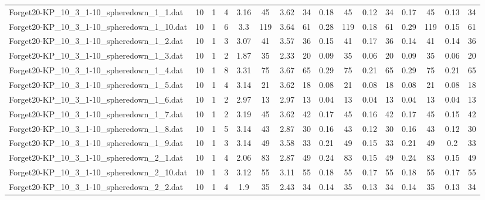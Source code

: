 \begin{sidewaystable}[!ht]
{\begin{tabular}{lccccccccccccccc}
Forget20-KP\_10\_3\_1-10\_spheredown\_1\_1.dat & 10 & 1 & 4 & 3.16 & 45 & 3.62 & 34 & 0.18 & 45 &  \textcolor{blue2}{0.12} & 34 & 0.17 & 45 & 0.13 & 34 \\
Forget20-KP\_10\_3\_1-10\_spheredown\_1\_10.dat & 10 & 1 & 6 & 3.3 & 119 & 3.64 & 61 & 0.28 & 119 & 0.18 & 61 & 0.29 & 119 &  \textcolor{blue2}{0.15} & 61 \\
Forget20-KP\_10\_3\_1-10\_spheredown\_1\_2.dat & 10 & 1 & 3 & 3.07 & 41 & 3.57 & 36 & 0.15 & 41 & 0.17 & 36 &  \textcolor{blue2}{0.14} & 41 &  \textcolor{blue2}{0.14} & 36 \\
Forget20-KP\_10\_3\_1-10\_spheredown\_1\_3.dat & 10 & 1 & 2 & 1.87 & 35 & 2.33 & 20 & 0.09 & 35 &  \textcolor{blue2}{0.06} & 20 & 0.09 & 35 &  \textcolor{blue2}{0.06} & 20 \\
Forget20-KP\_10\_3\_1-10\_spheredown\_1\_4.dat & 10 & 1 & 8 & 3.31 & 75 & 3.67 & 65 & 0.29 & 75 &  \textcolor{blue2}{0.21} & 65 & 0.29 & 75 &  \textcolor{blue2}{0.21} & 65 \\
Forget20-KP\_10\_3\_1-10\_spheredown\_1\_5.dat & 10 & 1 & 4 & 3.14 & 21 & 3.62 & 18 &  \textcolor{blue2}{0.08} & 21 &  \textcolor{blue2}{0.08} & 18 &  \textcolor{blue2}{0.08} & 21 &  \textcolor{blue2}{0.08} & 18 \\
Forget20-KP\_10\_3\_1-10\_spheredown\_1\_6.dat & 10 & 1 & 2 & 2.97 & 13 & 2.97 & 13 &  \textcolor{blue2}{0.04} & 13 &  \textcolor{blue2}{0.04} & 13 &  \textcolor{blue2}{0.04} & 13 &  \textcolor{blue2}{0.04} & 13 \\
Forget20-KP\_10\_3\_1-10\_spheredown\_1\_7.dat & 10 & 1 & 2 & 3.19 & 45 & 3.62 & 42 & 0.17 & 45 & 0.16 & 42 & 0.17 & 45 &  \textcolor{blue2}{0.15} & 42 \\
Forget20-KP\_10\_3\_1-10\_spheredown\_1\_8.dat & 10 & 1 & 5 & 3.14 & 43 & 2.87 & 30 & 0.16 & 43 &  \textcolor{blue2}{0.12} & 30 & 0.16 & 43 &  \textcolor{blue2}{0.12} & 30 \\
Forget20-KP\_10\_3\_1-10\_spheredown\_1\_9.dat & 10 & 1 & 3 & 3.14 & 49 & 3.58 & 33 & 0.21 & 49 &  \textcolor{blue2}{0.15} & 33 & 0.21 & 49 & 0.2 & 33 \\
Forget20-KP\_10\_3\_1-10\_spheredown\_2\_1.dat & 10 & 1 & 4 & 2.06 & 83 & 2.87 & 49 & 0.24 & 83 &  \textcolor{blue2}{0.15} & 49 & 0.24 & 83 &  \textcolor{blue2}{0.15} & 49 \\
Forget20-KP\_10\_3\_1-10\_spheredown\_2\_10.dat & 10 & 1 & 3 & 3.12 & 55 & 3.11 & 55 & 0.18 & 55 &  \textcolor{blue2}{0.17} & 55 & 0.18 & 55 &  \textcolor{blue2}{0.17} & 55 \\
Forget20-KP\_10\_3\_1-10\_spheredown\_2\_2.dat & 10 & 1 & 4 & 1.9 & 35 & 2.43 & 34 & 0.14 & 35 &  \textcolor{blue2}{0.13} & 34 & 0.14 & 35 &  \textcolor{blue2}{0.13} & 34 \\

\end{tabular}}
\end{sidewaystable}
